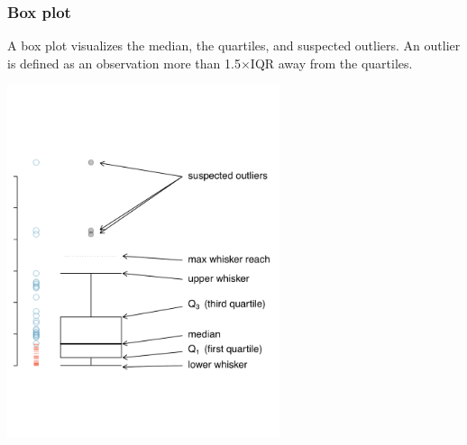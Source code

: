 \documentclass[11pt]{beamer}
\begin{document}
\begin{frame}
\frametitle{Box plot}

A \alert{box plot} visualizes the median, the quartiles, and suspected outliers. An \alert{outlier} is defined as an observation more than 1.5$\times$IQR away from the quartiles.

\begin{center}
\includegraphics[width=0.6\textwidth]{figures/boxPlotLayoutNumVar}
\end{center}


\end{frame}

\end{document}
